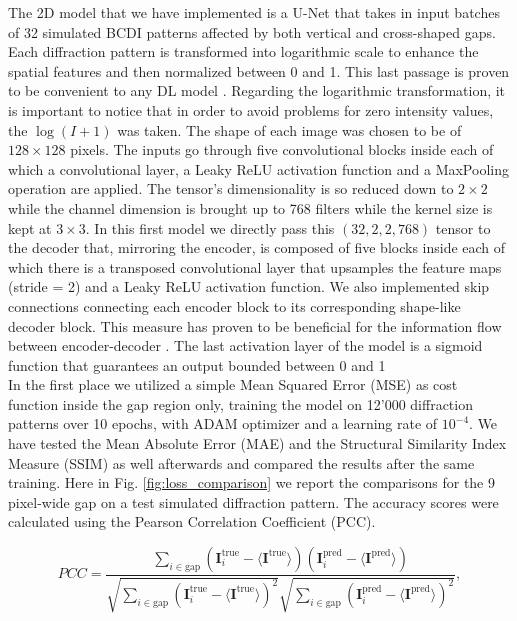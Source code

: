 The 2D model that we have implemented is a U-Net that takes in input batches of 32 simulated BCDI patterns affected 
by both vertical and cross-shaped gaps. Each diffraction pattern is transformed into logarithmic scale to enhance the 
spatial features and then normalized between 0 and 1. This last passage is proven to be convenient to any DL model \cite{efficientBackProp}.
Regarding the logarithmic transformation, it is important to notice that in order to avoid problems for zero intensity
values, the $\log(I+1)$ was taken.
The shape of each image was chosen to be of $128\times128$ pixels. The inputs go through five convolutional blocks 
inside each of which a convolutional layer, a Leaky ReLU activation function and a MaxPooling operation are applied. 
The tensor's dimensionality is so reduced down to $2\times2$ while the channel dimension is brought up to 768 filters 
while the kernel size is kept at $3\times3$. In this first model we directly pass this $(32,2,2,768)$ tensor to the 
decoder that, mirroring the encoder, is composed of five blocks inside each of which there is a transposed convolutional layer
that upsamples the feature maps (stride = 2) and a Leaky ReLU activation function. We also implemented skip connections connecting each encoder block
to its corresponding shape-like decoder block. This measure has proven to be beneficial for the information flow between
encoder-decoder \cite{li_visualizing_2017}. The last activation layer of the model is a sigmoid function that guarantees an output bounded between 0 and 1 \\ 

In the first place we utilized a simple Mean Squared Error (MSE) as cost function inside the gap region only, training 
the model on 12'000 diffraction patterns over 10 epochs, with ADAM optimizer and a learning rate of $10^{-4}$. 
We have tested the Mean Absolute Error (MAE) and the Structural Similarity Index Measure (SSIM) \cite{ssim}
as well afterwards and compared the results after the same training.
Here in Fig. \ref{fig:loss_comparison} we report the comparisons for the 9 pixel-wide gap on a test simulated diffraction
pattern. The accuracy scores were calculated using the Pearson Correlation Coefficient (PCC).

\begin{equation}
    PCC = \frac{\sum_{i\in \text{gap}}(\textbf{I}_i^{\text{true}} - 
    \langle \textbf{I}^{\text{true}}\rangle)(\textbf{I}_i^{\text{pred}}-
    \langle\textbf{I}^{\text{pred}}\rangle)}{\sqrt{\sum_{i\in \text{gap}}^{}(\textbf{I}_i^{\text{true}} - 
    \langle \textbf{I}^{\text{true}}\rangle)^2}\sqrt{\sum_{i\in \text{gap}}^{}(\textbf{I}_i^{\text{pred}}-
    \langle\textbf{I}^{\text{pred}}\rangle)^2}},
        \label{eq:accuracy}
\end{equation}

